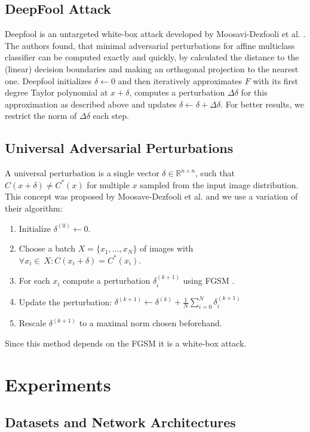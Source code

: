 \documentclass{article}
\begin{document}
\subsection{DeepFool Attack}
Deepfool is an untargeted white-box attack developed by Moosavi-Dezfooli et al. \cite{deepfool}.
The authors found, that minimal adversarial perturbations for affine multiclass classifier can be computed exactly and quickly,
by calculated the distance to the (linear) decision boundaries and making an orthogonal projection to the nearest one.
Deepfool initializes $\delta \gets 0$ and then iteratively approximates $F$ with its first degree Taylor polynomial at $x + \delta$, computes a perturbation $\Delta \delta$ for this approximation as described above and updates $\delta \gets \delta + \Delta \delta$.
For better results, we restrict the norm of $\Delta \delta$ each step.

\subsection{Universal Adversarial Perturbations}
A universal perturbation is a single vector $\delta \in \mathbb{R}^{n\times n}$, such that $C(x + \delta) \neq C^*(x)$ for multiple $x$ sampled from the input image distribution. This concept was proposed by Moosave-Dezfooli et al. \cite{universal} and we use a variation of their algorithm:
\begin{enumerate}
	\item Initialize $\delta^{(0)} \gets 0$.
	\item Choose a batch $X = \{x_1, ..., x_N\}$ of images with $\forall x_i \in\ X:  C(x_i + \delta) = C^*(x_i)$.
	\item For each $x_i$ compute a perturbation $\delta_i^{(k+1)}$ using FGSM \cite{fgsm}.
	\item Update the perturbation: $\delta^{(k+1)} \gets \delta^{(k)} + \frac{1}{N} \sum\limits_{i=0}^N \delta_i^{(k+1)}$
	\item Rescale $\delta^{(k+1)}$ to a maximal norm chosen beforehand.
\end{enumerate}
Since this method depends on the FGSM \cite{fgsm} it is a white-box attack.


\section{Experiments}
\label{lab:experiments}

\subsection{Datasets and Network Architectures}
\end{document}
